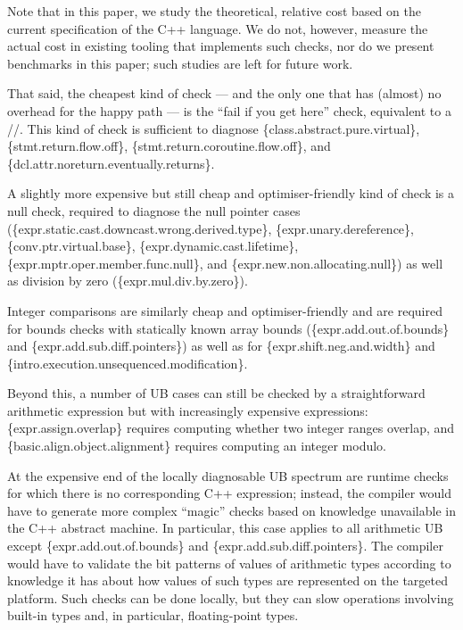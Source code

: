 {Note that in this paper, we study the theoretical, relative cost based on the current specification of the C++ language. We do not, however, measure the actual cost in existing tooling that implements such checks, nor do we present benchmarks in this paper; such studies are left for future work.

That said, the cheapest kind of check --- and the only one that has (almost) no overhead for the happy path --- is the ``fail if you get here'' check, equivalent to a //. This kind of check is sufficient to diagnose \{class.abstract.pure.virtual\}, \{stmt.return.flow.off\}, \{stmt.return.coroutine.flow.off\}, and \{dcl.attr.noreturn.eventually.returns\}.

A slightly more expensive but still cheap and optimiser-friendly kind of check is a null check, required to diagnose the null pointer cases  
(\{expr.static.cast.downcast.wrong.derived.type\},
\{expr.unary.deref\-erence\},
\{conv.ptr.virtual.base\},
\{expr.dynamic.cast.lifetime\}, 
\{expr.mptr.oper.member.\linebreak[3]func.null\}, and
\{expr.new.non.allocating.null\})
as well as division by zero (\{expr.mul.div.by.zero\}).

Integer comparisons are similarly cheap and optimiser-friendly and are   required for bounds checks with statically known array bounds
(\{expr.add.out.of.bounds\} and
\{expr.add.sub.diff.pointers\})
as well as for \{expr.shift.neg.and.width\} 
and \{intro.execution.unsequenced.modification\}.

Beyond this, a number of UB cases can still be checked by a straightforward arithmetic expression but with increasingly expensive expressions: \{expr.assign.overlap\} requires computing whether two integer ranges overlap, and  \{basic.align.object.alignment\} requires computing an integer modulo. 

At the expensive end of the locally diagnosable UB spectrum are runtime checks for which there is no corresponding C++ expression; instead, the compiler would have to generate more complex ``magic'' checks based on knowledge unavailable in the C++ abstract machine. In particular, this case applies to all arithmetic UB except \{expr.add.out.of.bounds\} and
\{expr.add.sub.diff.pointers\}. The compiler would have to validate the bit patterns of values of arithmetic types according to knowledge it has about how values of such types are represented on the targeted platform. Such checks can be done locally, but they can slow operations involving built-in types and, in particular, floating-point types.

}
